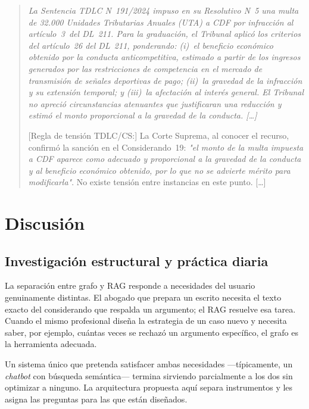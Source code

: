 \documentclass[12pt,a4paper]{article}
\begin{document}
\begin{quote}
\itshape
La Sentencia TDLC N\textdegree~191/2024 impuso en su Resolutivo N\textdegree~5 una
multa de 32.000 Unidades Tributarias Anuales (UTA) a CDF por infracción al
artículo~3\textdegree~del DL~211. Para la graduación, el Tribunal aplicó los
criterios del artículo~26 del DL~211, ponderando: (i)~el beneficio económico
obtenido por la conducta anticompetitiva, estimado a partir de los ingresos
generados por las restricciones de competencia en el mercado de transmisión de
señales deportivas de pago; (ii)~la gravedad de la infracción y su extensión
temporal; y (iii)~la afectación al interés general. El Tribunal no apreció
circunstancias atenuantes que justificaran una reducción y estimó el monto
proporcional a la gravedad de la conducta. [\ldots]

[Regla de tensión TDLC/CS:] La Corte Suprema, al conocer el recurso, confirmó
la sanción en el Considerando~19\textdegree: \emph{"el monto de la multa
impuesta a CDF aparece como adecuado y proporcional a la gravedad de la conducta
y al beneficio económico obtenido, por lo que no se advierte mérito para
modificarla"}. No existe tensión entre instancias en este punto. [\ldots]
\end{quote}

\section{Discusión}
\label{sec:discusion}

\subsection{Investigación estructural y práctica diaria}

La separación entre grafo y RAG responde a necesidades del usuario
genuinamente distintas. El abogado que prepara un escrito necesita el texto exacto
del considerando que respalda un argumento; el RAG resuelve esa tarea. Cuando el
mismo profesional diseña la estrategia de un caso nuevo y necesita saber, por
ejemplo, cuántas veces se rechazó un argumento específico, el grafo es
la herramienta adecuada.

Un sistema único que pretenda satisfacer ambas necesidades —típicamente, un
\textit{chatbot} con búsqueda semántica— termina sirviendo parcialmente a los dos
sin optimizar a ninguno. La arquitectura propuesta aquí separa instrumentos y les
asigna las preguntas para las que están diseñados.
\end{document}
